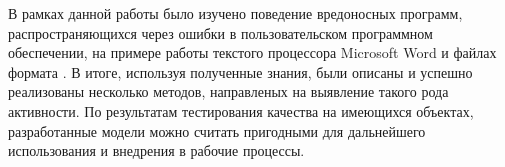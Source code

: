 
В рамках данной работы было изучено поведение вредоносных программ, распространяющихся через ошибки в пользовательском программном обеспечении, на примере работы текстого процессора Microsoft Word и файлах формата .
В итоге, используя полученные знания, были описаны и успешно реализованы несколько методов, направленых на выявление такого рода активности.
По результатам тестирования качества на имеющихся объектах, разработанные модели можно считать пригодными для дальнейшего использования и внедрения в рабочие процессы.